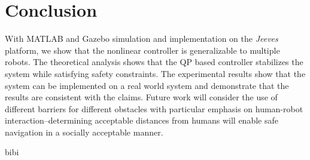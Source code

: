\documentclass[conference]{IEEEtran}
\begin{document}
\section{Conclusion}
With MATLAB and Gazebo simulation and implementation on the \textit{Jeeves} platform, we show that the nonlinear controller is generalizable to multiple robots. The theoretical analysis shows that the QP based controller stabilizes the system while satisfying safety constraints. The experimental results show that the system can be implemented on a real world system and demonstrate that the results are consistent with the claims. Future work will consider the use of different barriers for different obstacles with particular emphasis on human-robot interaction--determining acceptable distances from humans will enable safe navigation in a socially acceptable manner.


 {bibi}



\end{document}
